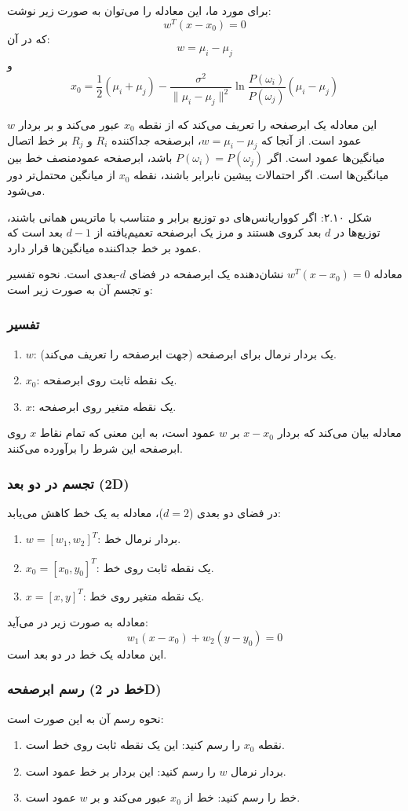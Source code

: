 \documentclass{article}
\begin{document}
برای مورد ما، این معادله را می‌توان به صورت زیر نوشت:
\[
w^T(x - x_0) = 0
\]
که در آن:
\[
w = \mu_i - \mu_j
\]
و
\[
x_0 = \frac{1}{2}(\mu_i + \mu_j) - \frac{\sigma^2}{\|\mu_i - \mu_j\|^2} \ln \frac{P(\omega_i)}{P(\omega_j)} (\mu_i - \mu_j)
\]

این معادله یک ابرصفحه را تعریف می‌کند که از نقطه $x_0$ عبور می‌کند و بر بردار $w$ عمود است. از آنجا که $w = \mu_i - \mu_j$، ابرصفحه جداکننده $R_i$ و $R_j$ بر خط اتصال میانگین‌ها عمود است. اگر $P(\omega_i) = P(\omega_j)$ باشد، ابرصفحه عمودمنصف خط بین میانگین‌ها است. اگر احتمالات پیشین نابرابر باشند، نقطه $x_0$ از میانگین محتمل‌تر دور می‌شود.

شکل ۲.۱۰: اگر کوواریانس‌های دو توزیع برابر و متناسب با ماتریس همانی باشند، توزیع‌ها در $d$ بعد کروی هستند و مرز یک ابرصفحه تعمیم‌یافته از $d-1$ بعد است که عمود بر خط جداکننده میانگین‌ها قرار دارد.

معادله $w^T(x - x_0) = 0$ نشان‌دهنده یک ابرصفحه در فضای $d$-بعدی است. نحوه تفسیر و تجسم آن به صورت زیر است:

\subsubsection*{تفسیر}
\begin{enumerate}
    \item $w$: یک بردار نرمال برای ابرصفحه (جهت ابرصفحه را تعریف می‌کند).
    \item $x_0$: یک نقطه ثابت روی ابرصفحه.
    \item $x$: یک نقطه متغیر روی ابرصفحه.
\end{enumerate}
معادله بیان می‌کند که بردار $x - x_0$ بر $w$ عمود است، به این معنی که تمام نقاط $x$ روی ابرصفحه این شرط را برآورده می‌کنند.

\subsubsection*{تجسم در دو بعد (2D)}
در فضای دو بعدی ($d=2$)، معادله به یک خط کاهش می‌یابد:
\begin{enumerate}
    \item $w = [w_1, w_2]^T$: بردار نرمال خط.
    \item $x_0 = [x_0, y_0]^T$: یک نقطه ثابت روی خط.
    \item $x = [x, y]^T$: یک نقطه متغیر روی خط.
\end{enumerate}
معادله به صورت زیر در می‌آید:
\[
w_1(x - x_0) + w_2(y - y_0) = 0
\]
این معادله یک خط در دو بعد است.

\subsubsection*{رسم ابرصفحه (خط در 2D)}
نحوه رسم آن به این صورت است:
\begin{enumerate}
    \item نقطه $x_0$ را رسم کنید: این یک نقطه ثابت روی خط است.
    \item بردار نرمال $w$ را رسم کنید: این بردار بر خط عمود است.
    \item خط را رسم کنید: خط از $x_0$ عبور می‌کند و بر $w$ عمود است.
\end{enumerate}
\end{document}
